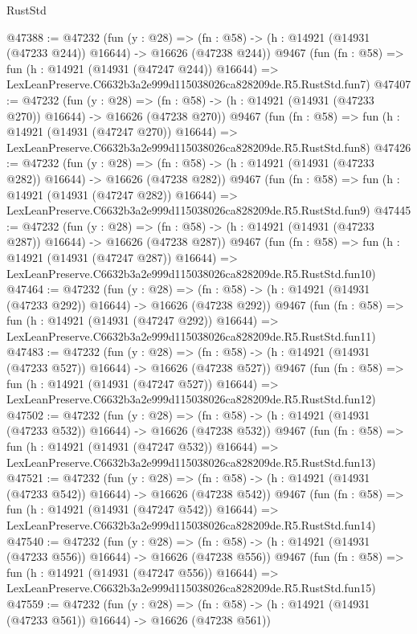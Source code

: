 \begin{lexlean}{RustStd}
\begin{coremodule}
@47388 := @47232
    (fun (y : @28) =>
    (fn : @58) -> (h : @14921 (@14931 (@47233 @244)) @16644) -> @16626 (@47238 @244))
    @9467
    (fun (fn : @58) =>
    fun (h : @14921 (@14931 (@47247 @244)) @16644) =>
    LexLeanPreserve.C6632b3a2e999d115038026ca828209de.R5.RustStd.fun7)
@47407 := @47232
    (fun (y : @28) =>
    (fn : @58) -> (h : @14921 (@14931 (@47233 @270)) @16644) -> @16626 (@47238 @270))
    @9467
    (fun (fn : @58) =>
    fun (h : @14921 (@14931 (@47247 @270)) @16644) =>
    LexLeanPreserve.C6632b3a2e999d115038026ca828209de.R5.RustStd.fun8)
@47426 := @47232
    (fun (y : @28) =>
    (fn : @58) -> (h : @14921 (@14931 (@47233 @282)) @16644) -> @16626 (@47238 @282))
    @9467
    (fun (fn : @58) =>
    fun (h : @14921 (@14931 (@47247 @282)) @16644) =>
    LexLeanPreserve.C6632b3a2e999d115038026ca828209de.R5.RustStd.fun9)
@47445 := @47232
    (fun (y : @28) =>
    (fn : @58) -> (h : @14921 (@14931 (@47233 @287)) @16644) -> @16626 (@47238 @287))
    @9467
    (fun (fn : @58) =>
    fun (h : @14921 (@14931 (@47247 @287)) @16644) =>
    LexLeanPreserve.C6632b3a2e999d115038026ca828209de.R5.RustStd.fun10)
@47464 := @47232
    (fun (y : @28) =>
    (fn : @58) -> (h : @14921 (@14931 (@47233 @292)) @16644) -> @16626 (@47238 @292))
    @9467
    (fun (fn : @58) =>
    fun (h : @14921 (@14931 (@47247 @292)) @16644) =>
    LexLeanPreserve.C6632b3a2e999d115038026ca828209de.R5.RustStd.fun11)
@47483 := @47232
    (fun (y : @28) =>
    (fn : @58) -> (h : @14921 (@14931 (@47233 @527)) @16644) -> @16626 (@47238 @527))
    @9467
    (fun (fn : @58) =>
    fun (h : @14921 (@14931 (@47247 @527)) @16644) =>
    LexLeanPreserve.C6632b3a2e999d115038026ca828209de.R5.RustStd.fun12)
@47502 := @47232
    (fun (y : @28) =>
    (fn : @58) -> (h : @14921 (@14931 (@47233 @532)) @16644) -> @16626 (@47238 @532))
    @9467
    (fun (fn : @58) =>
    fun (h : @14921 (@14931 (@47247 @532)) @16644) =>
    LexLeanPreserve.C6632b3a2e999d115038026ca828209de.R5.RustStd.fun13)
@47521 := @47232
    (fun (y : @28) =>
    (fn : @58) -> (h : @14921 (@14931 (@47233 @542)) @16644) -> @16626 (@47238 @542))
    @9467
    (fun (fn : @58) =>
    fun (h : @14921 (@14931 (@47247 @542)) @16644) =>
    LexLeanPreserve.C6632b3a2e999d115038026ca828209de.R5.RustStd.fun14)
@47540 := @47232
    (fun (y : @28) =>
    (fn : @58) -> (h : @14921 (@14931 (@47233 @556)) @16644) -> @16626 (@47238 @556))
    @9467
    (fun (fn : @58) =>
    fun (h : @14921 (@14931 (@47247 @556)) @16644) =>
    LexLeanPreserve.C6632b3a2e999d115038026ca828209de.R5.RustStd.fun15)
@47559 := @47232
    (fun (y : @28) =>
    (fn : @58) -> (h : @14921 (@14931 (@47233 @561)) @16644) -> @16626 (@47238 @561))

\end{coremodule}
\end{lexlean}
